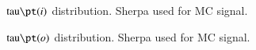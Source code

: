 \begin{figure}[h!tbp]
	\centering
	\hfill
	\caption{$\text{tau}\pt(i)$ distribution. Sherpa used for MC signal.}
	\label{AFig5S}
\end{figure} 

\begin{figure}[h!tbp]
	\centering
	\hfill
	\caption{$\text{tau}\pt(o)$ distribution. Sherpa used for MC signal.}
\label{AFig6S}
\end{figure} 

